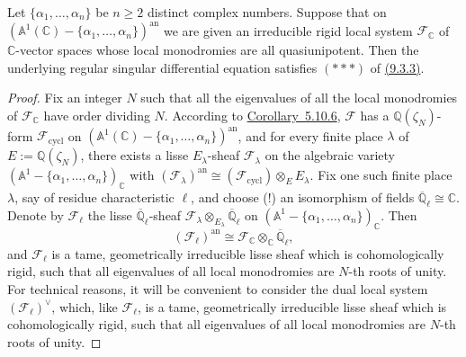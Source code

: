 Let \(\{\alpha_1,\ldots,\alpha_n\}\) be \(n\geq2\) distinct complex numbers. Suppose that on \((\mathbb{A}^1(\mathbb{C})-\{\alpha_1,\ldots,\alpha_n\})^{\mathrm{an}}\) we are given an irreducible rigid local system \(\mathcal{F}_{\mathbb{C}}\) of \(\mathbb{C}\)-vector spaces whose local monodromies are all quasiunipotent. Then the underlying regular singular differential equation satisfies \((***)\) of \hyperref[par:9.3.3]{(9.3.3)}.
\begin{proof}
Fix an integer \(N\) such that all the eigenvalues of all the local monodromies of \(\mathcal{F}_{\mathbb{C}}\) have order dividing \(N\). According to \hyperref[cor:5.10.6]{Corollary~5.10.6}, \(\mathcal{F}\) has a \(\mathbb{Q}(\zeta_N)\)-form \(\mathcal{F}_{\mathrm{cycl}}\) on \((\mathbb{A}^1(\mathbb{C})-\{\alpha_1,\ldots,\alpha_n\})^{\mathrm{an}}\), and for every finite place \(\lambda\) of \(E:=\mathbb{Q}(\zeta_N)\), there exists a lisse \(E_\lambda\)-sheaf \(\mathcal{F}_\lambda\) on the algebraic variety \((\mathbb{A}^1-\{\alpha_1,\ldots,\alpha_n\})_{\mathbb{C}}\) with \((\mathcal{F}_\lambda)^{\mathrm{an}}\cong(\mathcal{F}_{\mathrm{cycl}})\otimes_EE_\lambda\).
Fix one such finite place \(\lambda\), say of residue characteristic \(\ell\), and choose (!) an isomorphism of fields \(\overline{\mathbb{Q}}_\ell\cong\mathbb{C}\). Denote by \(\mathcal{F}_\ell\) the lisse \(\overline{\mathbb{Q}}_\ell\)-sheaf \(\mathcal{F}_\lambda\otimes_{E_\lambda}\overline{\mathbb{Q}}_\ell\) on \((\mathbb{A}^1-\{\alpha_1,\ldots,\alpha_n\})_{\mathbb{C}}\). Then
\[
(\mathcal{F}_\ell)^{\mathrm{an}}\cong\mathcal{F}_{\mathbb{C}}\otimes_{\mathbb{C}}\overline{\mathbb{Q}}_\ell,
\]
and \(\mathcal{F}_\ell\) is a tame, geometrically irreducible lisse sheaf which is cohomologically rigid, such that all eigenvalues of all local monodromies are \(N\)-th roots of unity. For technical reasons, it will be convenient to consider the dual local system \((\mathcal{F}_\ell)^\vee\), which, like \(\mathcal{F}_\ell\), is a tame, geometrically irreducible lisse sheaf which is cohomologically rigid, such that all eigenvalues of all local monodromies are \(N\)-th roots of unity.


\end{proof}
